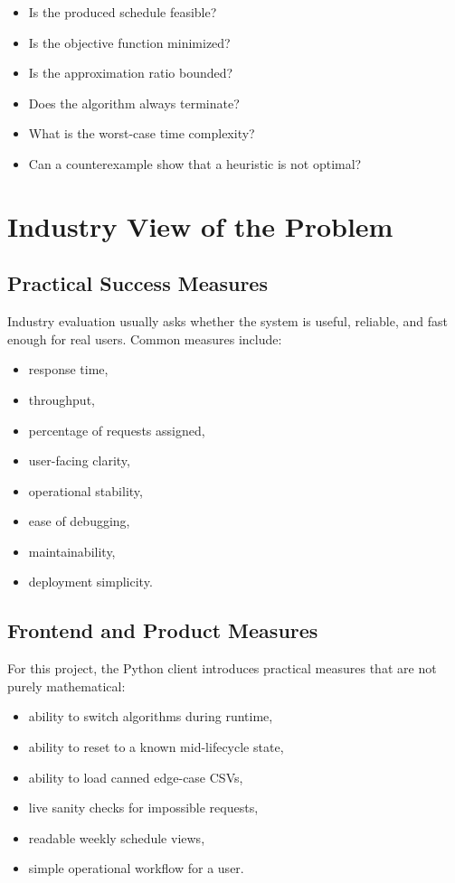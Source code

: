 \documentclass[12pt,a4paper]{article}
\begin{document}
\begin{itemize}[noitemsep]
    \item Is the produced schedule feasible?
    \item Is the objective function minimized?
    \item Is the approximation ratio bounded?
    \item Does the algorithm always terminate?
    \item What is the worst-case time complexity?
    \item Can a counterexample show that a heuristic is not optimal?
\end{itemize}

\section{Industry View of the Problem}

\subsection{Practical Success Measures}

Industry evaluation usually asks whether the system is useful, reliable, and fast enough for real users. Common measures include:

\begin{itemize}[noitemsep]
    \item response time,
    \item throughput,
    \item percentage of requests assigned,
    \item user-facing clarity,
    \item operational stability,
    \item ease of debugging,
    \item maintainability,
    \item deployment simplicity.
\end{itemize}

\subsection{Frontend and Product Measures}

For this project, the Python client introduces practical measures that are not purely mathematical:

\begin{itemize}[noitemsep]
    \item ability to switch algorithms during runtime,
    \item ability to reset to a known mid-lifecycle state,
    \item ability to load canned edge-case CSVs,
    \item live sanity checks for impossible requests,
    \item readable weekly schedule views,
    \item simple operational workflow for a user.
\end{itemize}
\end{document}
